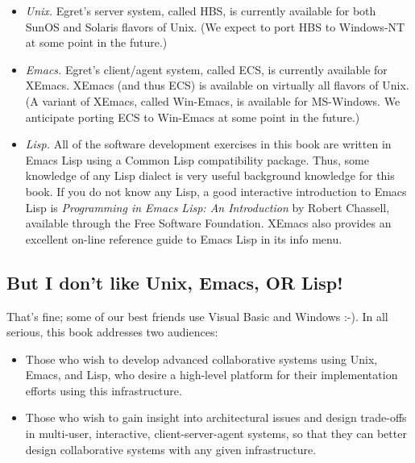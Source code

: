 \begin{itemize}

\item {\em Unix.}  Egret's server system, called HBS, is currently
  available for both SunOS and Solaris flavors of Unix. (We expect to port
  HBS to Windows-NT at some point in the future.)

\item {\em Emacs.}  Egret's client/agent system, called ECS, is currently
  available for XEmacs.  XEmacs (and thus ECS) is available on virtually all
  flavors of Unix.  (A variant of XEmacs, called Win-Emacs, is available
  for MS-Windows.  We anticipate porting ECS to Win-Emacs at some point in the
  future.)

\item {\em Lisp.}  All of the software development exercises in this
  book are written in Emacs Lisp using a Common Lisp compatibility
  package. Thus, some knowledge of any Lisp dialect is very useful
  background knowledge for this book.  If you do not know any Lisp, a
  good interactive introduction to Emacs Lisp is {\em Programming in
  Emacs Lisp: An Introduction} by Robert Chassell, available through
  the Free Software Foundation.  XEmacs also provides
  an excellent on-line reference guide to Emacs Lisp in its info menu.

\end{itemize}

\subsection*{But I don't like Unix, Emacs, OR Lisp!}

That's fine; some of our best friends use Visual Basic and
Windows :-).  In all serious, this book addresses two audiences:

\begin{itemize}

\item Those who wish to develop advanced collaborative systems using
  Unix, Emacs, and Lisp, who desire a high-level platform for their
  implementation efforts using this infrastructure.

\item Those who wish to gain insight into architectural issues and design
  trade-offs in multi-user, interactive, client-server-agent systems, so
  that they can better design collaborative systems with any given
  infrastructure.

\end{itemize}

